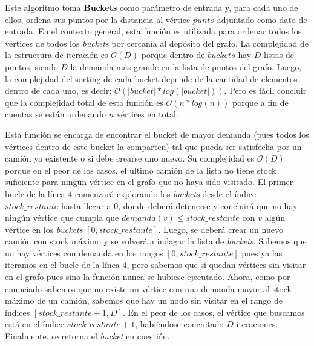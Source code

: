 \vskip 8pt



Este algoritmo toma \textbf{Buckets} como parámetro de entrada y, para cada uno de ellos, ordena sus puntos por la distancia al vértice $punto$ adjuntado como dato de entrada. En el contexto general, esta función es utilizada para ordenar todos los vértices de todos los \textit{buckets} por cercanía al depósito del grafo. La complejidad de la estructura de iteración es $\mathcal{O}(D)$ porque dentro de $buckets$ hay $D$ listas de puntos, siendo $D$ la demanda más grande en la lista de puntos del grafo. Luego, la complejidad del sorting de cada bucket depende de la cantidad de elementos dentro de cada uno, es decir: $\mathcal{O}(|bucket| * log(|bucket|))$. Pero es fácil concluir que la complejidad total de esta función es $\mathcal{O}(n * log(n))$ porque a fin de cuentas se están ordenando $n$ vértices en total.



Esta función se encarga de encontrar el bucket de mayor demanda (pues todos los vértices dentro de este bucket la comparten) tal que pueda ser satisfecha por un camión ya existente o si debe crearse uno nuevo. Su complejidad es $\mathcal{O}(D)$ porque en el peor de los casos, el último camión de la lista no tiene stock suficiente para ningún vértice en el grafo que no haya sido visitado. El primer bucle de la línea 4 comenzará explorando los \textit{buckets} desde el índice $stock\_restante$ hasta llegar a $0$, donde deberá detenerse y concluirá que no hay ningún vértice que cumpla que $demanda(v) \leq stock\_restante$ con $v$ algún vértice en los \textit{buckets} $[0, stock\_restante]$. Luego, se deberá crear un nuevo camión con stock máximo y se volverá a indagar la lista de \textit{buckets}. Sabemos que no hay vértices con demanda en los rangos $[0, stock\_restante]$ pues ya las iteramos en el bucle de la línea 4, pero sabemos que sí quedan vértices sin visitar en el grafo pues sino la función nunca se hubiese ejecutado. Ahora, como por enunciado sabemos que no existe un vértice con una demanda mayor al stock máximo de un camión, sabemos que hay un nodo sin visitar en el rango de índices $[stock\_restante + 1, D]$. En el peor de los casos, el vértice que buscamos está en el índice $stock\_restante + 1$, habiéndose concretado $D$ iteraciones. Finalmente, se retorna el \textit{bucket} en cuestión.
